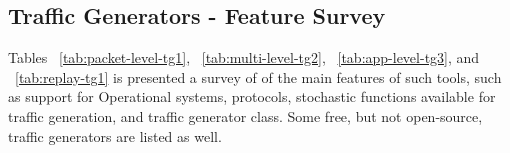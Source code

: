\subsection{Traffic Generators - Feature Survey}


Tables ~\ref{tab:packet-level-tg1}, ~\ref{tab:multi-level-tg2}, ~\ref{tab:app-level-tg3}, and ~\ref{tab:replay-tg1} is presented a survey of of the main features of such tools, such as support for Operational systems, protocols, stochastic functions available for traffic generation, and traffic generator class. Some free, but not open-source, traffic generators are listed as well. 

